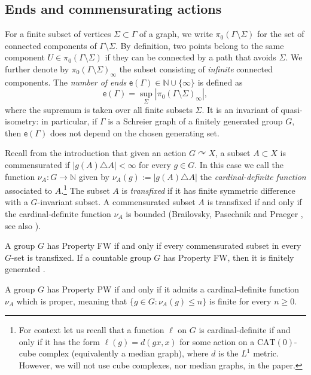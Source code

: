 \documentclass[11pt]{amsart}
\newcommand{\N}{\ensuremath{\mathbb{N}}}%
\newcommand{\acts}{\ensuremath{\curvearrowright}}%
\newcommand{\esf}{\ensuremath{\mathsf{e}}}
\theoremstyle{definition}
\theoremstyle{plain}
\newtheorem{main thm}{Theorem}
\theoremstyle{remark}
\theoremstyle{plain}
\begin{document}
\subsection{Ends and commensurating actions}
        For a finite subset of vertices $\Sigma\subset \Gamma$ of a graph, we write $\pi_0(\Gamma\setminus \Sigma)$ for the set of connected components of $\Gamma\setminus \Sigma$. By definition, two points belong to the same component $U\in \pi_0(\Gamma\setminus \Sigma)$ if they can be connected by a path that avoids $\Sigma$. We further denote by $\pi_0(\Gamma\setminus \Sigma)_\infty$ the subset consisting of \emph{infinite} connected components. The \emph{number of ends} $\esf(\Gamma)\in \N\cup\{\infty\}$ is defined as \[\esf(\Gamma)=\sup_\Sigma |\pi_0(\Gamma\setminus \Sigma)_\infty|,\] where the supremum is taken over all finite subsets $\Sigma$. It is an invariant of quasi-isometry: in particular, if $\Gamma$ is a Schreier graph of a finitely generated group $G$, then $\esf(\Gamma)$ does not depend on the chosen generating set.


        

        




Recall from the introduction that given an action $G\acts X$,  a subset $A\subset X$ is commensurated if $|g(A)\triangle A|<\infty$ for every $g\in G$. In this case we call the function $\nu_A\colon G\to \N$ given by
$\nu_A(g):=|g(A)\triangle A|$
the \emph{cardinal-definite function} associated to $A$.\footnote{For context let us recall that a function $\ell$ on $G$ is cardinal-definite if and only if it has the form $\ell(g)=d(gx, x)$ for some action on a $\mathrm{CAT}(0)$-cube complex (equivalently a median graph), where $d$ is the $L^1$ metric. However, we will not use cube complexes, nor median graphs, in the paper.}
The subset $A$ is \emph{transfixed} if it has finite symmetric difference with a $G$-invariant subset.  A commensurated subset $A$ is transfixed if and only if the cardinal-definite function $\nu_A$ is bounded (Brailovsky, Pasechnik and Praeger \cite{BPP}, see also \cite[Theorem 4.E.1]{Cor-FWsurvey}).

A group $G$ has Property FW if and only if every commensurated subset in every $G$-set is transfixed. If a countable group $G$ has Property FW, then it is finitely generated \cite[Proposition 5.A.3(2)]{Cor-FWsurvey}.

A group $G$ has Property PW if and only if it admits a cardinal-definite function $\nu_A$ which is proper, meaning that $\{g\in G\colon \nu_A(g)\leq n
\}$ is finite for every $n\ge 0$.
\end{document}
